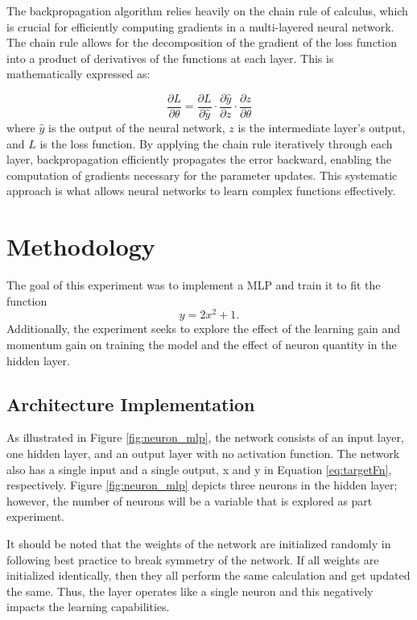 \documentclass[11pt,pdftex,portrait,letterpaper]{article}
\begin{document}
The backpropagation algorithm relies heavily on the chain rule of calculus, which is crucial for efficiently computing gradients in a multi-layered neural network. The chain rule allows for the decomposition of the gradient of the loss function into a product of derivatives of the functions at each layer. This is mathematically expressed as:

\begin{equation} \label{eq:chainrule}
    \frac{\partial L}{\partial \theta} = \frac{\partial L}{\partial \hat{y}} \cdot \frac{\partial \hat{y}}{\partial z} \cdot \frac{\partial z}{\partial \theta}
\end{equation}
where \( \hat{y} \) is the output of the neural network, \( z \) is the intermediate layer's output, and \( L \) is the loss function. By applying the chain rule iteratively through each layer, backpropagation efficiently propagates the error backward, enabling the computation of gradients necessary for the parameter updates. This systematic approach is what allows neural networks to learn complex functions effectively.

\section{Methodology}

The goal of this experiment was to implement a MLP and train it to fit the function 
\begin{equation} \label{eq:targetFn}
    y=2x^2+1.
\end{equation}
Additionally, the experiment seeks to explore the effect of the learning gain and momentum gain on training the model and the effect of neuron quantity in the hidden layer.

\subsection{Architecture Implementation}

As illustrated in Figure \ref{fig:neuron_mlp}, the network consists of an input layer, one hidden layer, and an output layer with no activation function. The network also has a single input and a single output, x and y in Equation \ref{eq:targetFn}, respectively. Figure \ref{fig:neuron_mlp} depicts three neurons in the hidden layer; however, the number of neurons will be a variable that is explored as part experiment.

It should be noted that the weights of the network are initialized randomly in following best practice to break symmetry of the network. If all weights are initialized identically, then they all perform the same calculation and get updated the same. Thus, the layer operates like a single neuron and this negatively impacts the learning capabilities.
\end{document}
